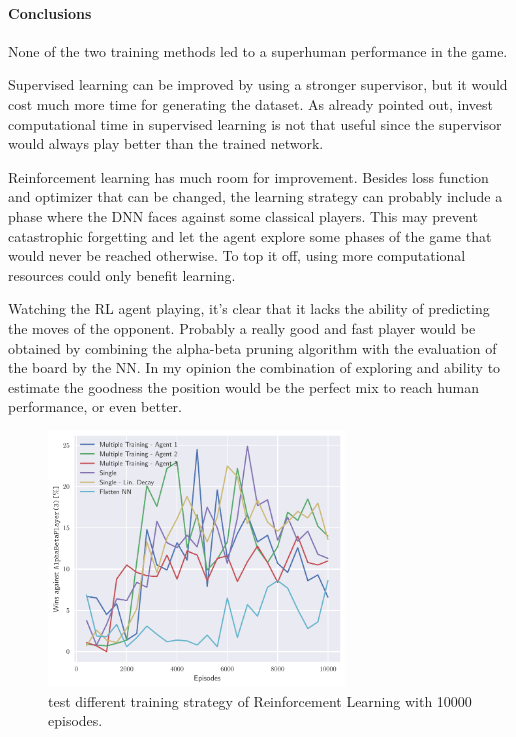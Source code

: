 \documentclass{article}
\begin{document}
  \paragraph{Conclusions} None of the two training methods led to a superhuman performance in the game.
  
  Supervised learning can be improved by using a stronger supervisor, but it would cost much more time for generating the dataset. As already pointed out, invest computational time in supervised learning is not that useful since the supervisor would always play better than the trained network.
  
  Reinforcement learning has much room for improvement. Besides loss function and optimizer that can be changed,
  the learning strategy can probably include a phase where the DNN faces against some classical players. This may prevent catastrophic forgetting and let the agent explore some phases of the game that would never be reached otherwise.
  To top it off, using more computational resources could only benefit learning.
  
  Watching the RL agent playing, it's clear that it lacks the ability of predicting the moves of the opponent. 
  Probably a really good and fast player would be obtained by combining the alpha-beta pruning algorithm with the evaluation of the board by the NN.
  In my opinion the combination of exploring and ability to estimate the goodness the position would be the perfect mix to reach human performance, or even better.
  
  

  \begin{figure}
    \centering
    \includegraphics[width=0.7\textwidth]{img/reinforcement-10k-comparsion.pdf}
    
    \caption{test different training strategy of Reinforcement Learning with 10000 episodes.}
    \label{fig:reinforcement10k}
  \end{figure}
\end{document}
